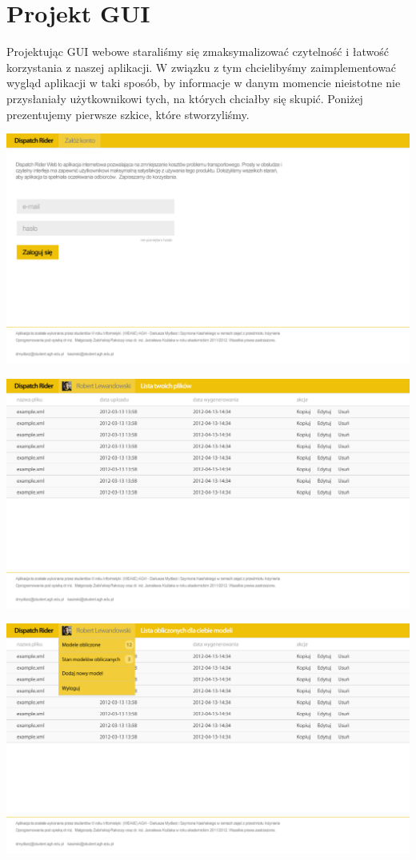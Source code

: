 \section{Projekt GUI}
Projektując GUI webowe staraliśmy się zmaksymalizować czytelność i łatwość korzystania z naszej aplikacji. W związku z tym chcielibyśmy zaimplementować wygląd aplikacji w taki sposób, by informacje w danym momencie nieistotne nie przysłaniały użytkownikowi tych, na których chciałby się skupić. Poniżej prezentujemy pierwsze szkice, które stworzyliśmy. 
\begin{center}
\includegraphics[scale=0.3]{imgs/unlogged_home.jpg}

\includegraphics[scale=0.3]{imgs/logged_home.jpg}

\includegraphics[scale=0.3]{imgs/logged_home_menu.jpg}


\end{center}
